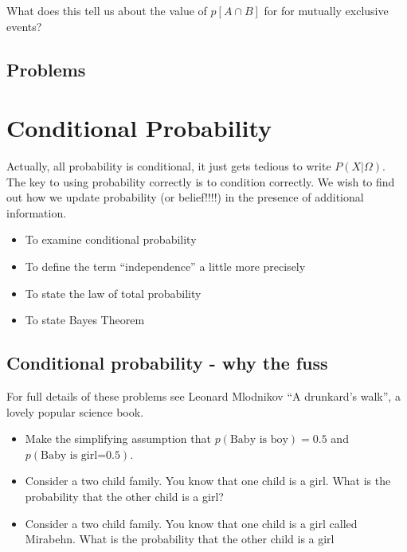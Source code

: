 \documentclass[12pt]{extbook}
\begin{document}
{\color{green}What does this tell us about the value of $p[A \cap B]$ for for mutually exclusive events?}


\section{Problems}
\begin{enumerate}







\end{enumerate}


\chapter{Conditional Probability}

Actually, all probability is conditional, it just gets tedious to write $P(X|\Omega)$.   The key to using probability correctly is to condition correctly.   
We wish to find out how we update probability (or belief!!!!) in the presence of additional information.

\begin{itemize}
\item To examine conditional probability
\item To define the term ``independence'' a little more precisely
\item To state the law of total probability
\item To state Bayes Theorem
\end{itemize}


% 


 

\section{Conditional probability - why the fuss}

For full details of these problems see Leonard Mlodnikov ``A drunkard's walk'', a lovely popular science book.

\begin{itemize}
\item Make the simplifying assumption that $p(\mbox{Baby is boy}) = 0.5$ and $p(\mbox{Baby is girl=0.5})$.
\item Consider a two child family.   You know that one child is a girl.   What is the probability that the other child is a girl?
\item Consider a two child family.   You know that one child is a girl called Mirabehn.   What is the probability that the other child is a girl
\end{itemize}
\end{document}
